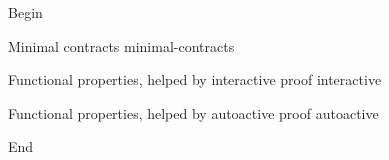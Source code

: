 Begin

\begin{levelTwo}
  {Minimal contracts}
  {minimal-contracts}
\end{levelTwo}

\begin{levelTwo}
  {Functional properties, helped by interactive proof}
  {interactive}
\end{levelTwo}

\begin{levelTwo}
  {Functional properties, helped by autoactive proof}
  {autoactive}
\end{levelTwo}


\horizontalLine


End

